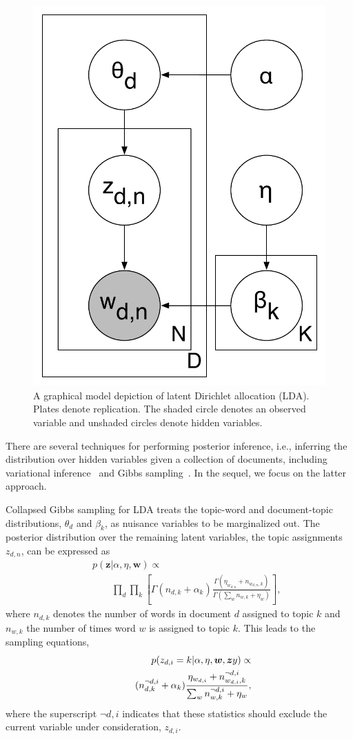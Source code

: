 \begin{figure}
\centering
\includegraphics[width=0.5\linewidth]{figures/lda}
\caption{A graphical model depiction of latent Dirichlet allocation
  (LDA).  Plates denote replication.  The shaded circle denotes an
  observed variable and unshaded circles denote hidden variables.}
\label{fig:lda}
\end{figure}


There are several techniques for performing posterior inference,
i.e., inferring the distribution over hidden variables given a
collection of documents, including variational
inference~\cite{blei-03} and Gibbs sampling~\cite{griffiths-06}.  In
the sequel, we focus on the latter approach.  

Collapsed Gibbs sampling for LDA treats the topic-word and
document-topic distributions, $\theta_d$ and $\beta_k$, as nuisance
variables to be marginalized out. The posterior distribution over the
remaining latent variables, the topic assignments $z_{d,n}$, can be
expressed as
\begin{eqnarray*}
  &&p(\bm{z} | \alpha, \eta, \bm{w}) \propto \\
  &&\qquad \prod_{d}\prod_{k} \left[ \Gamma(n_{d,k} + \alpha_{k})\frac{\Gamma(\eta_{w_{d,n}} + n_{w_{d,n}, k})}{\Gamma(\sum_w n_{w, k} + \eta_w)}\right],
\end{eqnarray*}
where $n_{d,k}$ denotes the number of words in document $d$ assigned
to topic $k$ and $n_{w,k}$ the number of times word $w$ is assigned to
topic $k$.  This leads to the sampling equations,
\begin{eqnarray}
  &&p(z_{d,i} = k | \alpha, \eta, \bm{w}, \bm{z}y) \propto \notag \\
  &&\qquad (n^{\lnot d,i}_{d,k} + \alpha_{k})\frac{\eta_{w_{d,i}} + n^{\lnot d,i}_{w_{d,i}, k}}{\sum_w n^{\lnot d,i}_{w, k} + \eta_w},
  \label{eq:sampling}
\end{eqnarray}
where the superscript $\lnot d,i$ indicates that these statistics
should exclude the current variable under consideration, $z_{d,i}$.

